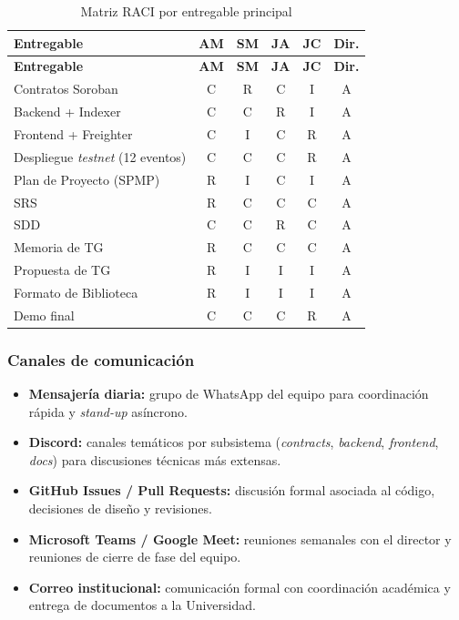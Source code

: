 \documentclass[12pt,oneside]{report}
\begin{document}
      \begin{longtable}{@{}p{4.8cm} c c c c c@{}}
        \caption{Matriz RACI por entregable principal}
        \label{tab:raci}\\
        \toprule
        \textbf{Entregable} & \textbf{AM} & \textbf{SM} & \textbf{JA} & \textbf{JC} & \textbf{Dir.}\\
        \midrule
        \endfirsthead
        \toprule
        \textbf{Entregable} & \textbf{AM} & \textbf{SM} & \textbf{JA} & \textbf{JC} & \textbf{Dir.}\\
        \midrule
        \endhead
        \bottomrule
        \endfoot
        Contratos Soroban & C & R & C & I & A\\
        Backend + Indexer & C & C & R & I & A\\
        Frontend + Freighter & C & I & C & R & A\\
        Despliegue \textit{testnet} (12 eventos) & C & C & C & R & A\\
        Plan de Proyecto (SPMP) & R & I & C & I & A\\
        SRS & R & C & C & C & A\\
        SDD & C & C & R & C & A\\
        Memoria de TG & R & C & C & C & A\\
        Propuesta de TG & R & I & I & I & A\\
        Formato de Biblioteca & R & I & I & I & A\\
        Demo final & C & C & C & R & A\\
      \end{longtable}

      \subsubsection{Canales de comunicación}
      \begin{itemize}
        \item \textbf{Mensajería diaria:} grupo de WhatsApp del equipo para coordinación rápida y \textit{stand-up} asíncrono.
        \item \textbf{Discord:} canales temáticos por subsistema (\textit{contracts}, \textit{backend}, \textit{frontend}, \textit{docs}) para discusiones técnicas más extensas.
        \item \textbf{GitHub Issues / Pull Requests:} discusión formal asociada al código, decisiones de diseño y revisiones.
        \item \textbf{Microsoft Teams / Google Meet:} reuniones semanales con el director y reuniones de cierre de fase del equipo.
        \item \textbf{Correo institucional:} comunicación formal con coordinación académica y entrega de documentos a la Universidad.
      \end{itemize}
\end{document}
